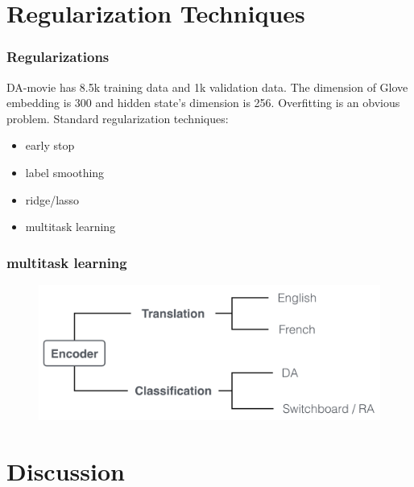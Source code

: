 \documentclass{beamer}
\begin{document}
\section{Regularization Techniques}
\frame{\tableofcontents[currentsection]}
\begin{frame}
\frametitle{Regularizations}
DA-movie has 8.5k training data and 1k validation data.  The dimension of Glove embedding is 300 and hidden state's dimension is 256. Overfitting is an obvious problem. 
Standard regularization techniques: 
\begin{itemize}
\item early stop
\item label smoothing
\item ridge/lasso
\item multitask learning

\end{itemize}


\end{frame}




\begin{frame}
\frametitle{multitask learning}
\begin{figure}
\includegraphics[scale=0.3]{summary.png}
\end{figure}


\end{frame}



















\section{Discussion}
\end{document}
